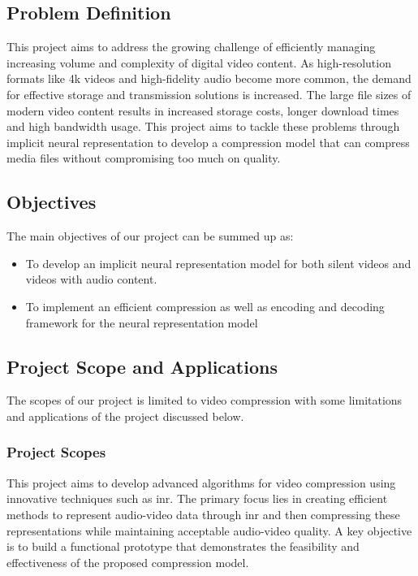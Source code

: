 \documentclass{ioereport}
\begin{document}
    \subsection{Problem Definition}
    This project aims to address the growing challenge of efficiently managing increasing volume and complexity of digital video content. As high-resolution formats like 4k videos and high-fidelity audio become more common, the demand for effective storage and transmission solutions is increased. The large file sizes of modern video content results in increased storage costs, longer download times and high bandwidth usage. This project aims to tackle these problems through implicit neural representation to develop a compression model that can compress media files without compromising too much on quality.
    
    \subsection{Objectives}
    The main objectives of our project can be summed up as:
    \begin{itemize}
        \item To develop an implicit neural representation model for both silent videos and videos with audio content.
        
        \item To implement an efficient compression as well as encoding and decoding framework for the neural representation model

    \end{itemize}

    
    \subsection{Project Scope and Applications}
    The scopes of our project is limited to video compression with some limitations and applications of the project discussed below.
        \subsubsection{Project Scopes}
        This project aims to develop advanced algorithms for video compression using innovative techniques such as \gls{inr}. The primary focus lies in creating efficient methods to represent audio-video data through \gls{inr} and then compressing these representations while maintaining acceptable audio-video quality. A key objective is to build a functional prototype that demonstrates the feasibility and effectiveness of the proposed compression model.
        
\end{document}
